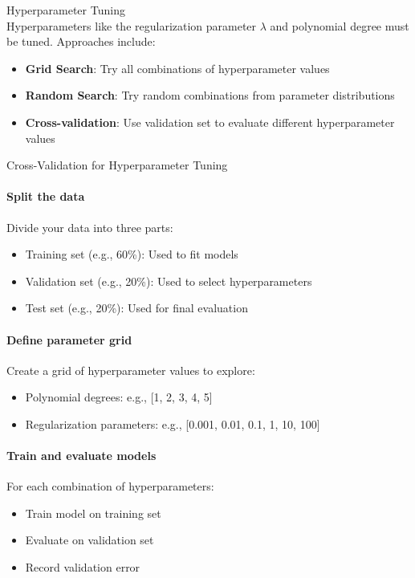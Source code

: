\begin{concept}{Hyperparameter Tuning}\\
Hyperparameters like the regularization parameter $\lambda$ and polynomial degree must be tuned. Approaches include:
\begin{itemize}
    \item \textbf{Grid Search}: Try all combinations of hyperparameter values
    \item \textbf{Random Search}: Try random combinations from parameter distributions
    \item \textbf{Cross-validation}: Use validation set to evaluate different hyperparameter values
\end{itemize}
\end{concept}

\begin{KR}{Cross-Validation for Hyperparameter Tuning}\\
\paragraph{Split the data}
Divide your data into three parts:
\begin{itemize}
    \item Training set (e.g., 60\%): Used to fit models
    \item Validation set (e.g., 20\%): Used to select hyperparameters
    \item Test set (e.g., 20\%): Used for final evaluation
\end{itemize}

\paragraph{Define parameter grid}
Create a grid of hyperparameter values to explore:
\begin{itemize}
    \item Polynomial degrees: e.g., [1, 2, 3, 4, 5]
    \item Regularization parameters: e.g., [0.001, 0.01, 0.1, 1, 10, 100]
\end{itemize}

\paragraph{Train and evaluate models}
For each combination of hyperparameters:
\begin{itemize}
    \item Train model on training set
    \item Evaluate on validation set
    \item Record validation error
\end{itemize}


\end{KR}
